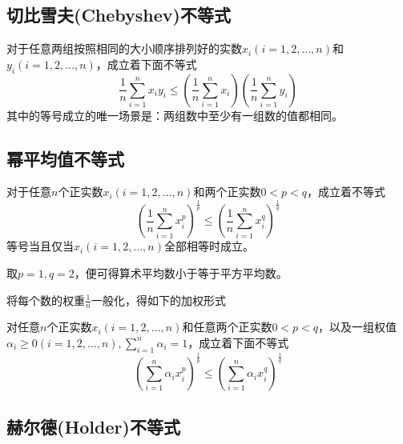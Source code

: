 \subsection{切比雪夫(Chebyshev)不等式}

\begin{theorem}[切比雪夫不等式]
对于任意两组按照相同的大小顺序排列好的实数$x_i(i=1,2,\ldots,n)$和$y_i(i=1,2,\ldots,n)$，成立着下面不等式
\begin{equation}
  \label{eq:chebyshev-inequation}
  \frac{1}{n}\sum_{i=1}^nx_iy_i \leqslant \left( \frac{1}{n}\sum_{i=1}^nx_i \right) \left( \frac{1}{n}\sum_{i=1}^ny_i \right)
\end{equation}
其中的等号成立的唯一场景是：两组数中至少有一组数的值都相同。
\end{theorem}

\subsection{幂平均值不等式}

\begin{theorem}[幂平均值不等式]
  对于任意$n$个正实数$x_i(i=1,2,\ldots,n)$和两个正实数$0<p<q$，成立着不等式
  \begin{equation}
    \label{eq:pow-mean-inequation}
    \left( \frac{1}{n}\sum_{i=1}^nx_i^{p} \right)^{\frac{1}{p}}
    \leqslant \left( \frac{1}{n}\sum_{i=1}^nx_i^{q} \right)^{\frac{1}{q}}
  \end{equation}
  等号当且仅当$x_i(i=1,2,\ldots,n)$全部相等时成立。
\end{theorem}
取$p=1,q=2$，便可得算术平均数小于等于平方平均数。

将每个数的权重$\frac{1}{n}$一般化，得如下的加权形式
\begin{theorem}[加权幂平均值不等式]
  对任意$n$个正实数$x_i(i=1,2,\ldots,n)$和任意两个正实数$0<p<q$，以及一组权值$\alpha_i \geqslant 0(i=1,2,\ldots,n), \sum_{i=1}^n\alpha_i=1$，成立着下面不等式
  \begin{equation}
    \label{eq:pow-mean-inequation-with-weight}
    \left( \sum_{i=1}^n\alpha_ix_i^p \right)^{\frac{1}{p}}
    \leqslant \left( \sum_{i=1}^n\alpha_ix_i^q \right)^{\frac{1}{q}}
  \end{equation}
\end{theorem}

\subsection{赫尔德(Holder)不等式}

